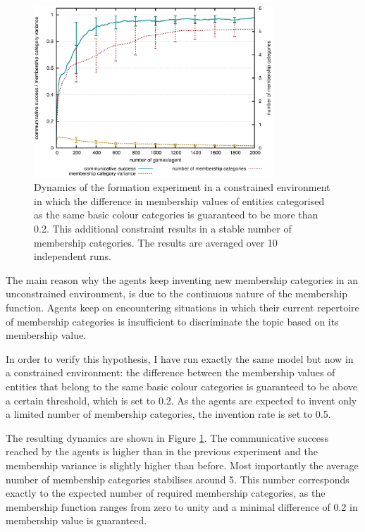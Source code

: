 \begin{figure}[htpb]
  \begin{center}
    \includegraphics[width=0.8\textwidth]{./graded-membership/figures/strict-formation-constrained.pdf} %
    \caption[Dynamics of the formation experiment in a constrained
    environment]{Dynamics of the formation experiment in a
      constrained environment in which the difference in membership
      values of entities categorised as the same basic colour
      categories is guaranteed to be more than 0.2. This additional
      constraint results in a stable number of membership
      categories. The results are averaged over 10 independent runs.}
    \label{f:gm-formation-constrained-dynamics}
  \end{center}
\end{figure}

The main reason why the agents keep inventing new membership
categories in an unconstrained environment, is due to the continuous
nature of the membership function. Agents keep on encountering
situations in which their current repertoire of membership categories
is insufficient to discriminate the topic based on its membership
value. 

In order to verify this hypothesis, I have run exactly the same
model but now in a constrained environment: the difference between the
membership values of entities that belong to the same basic colour
categories is guaranteed to be above a certain threshold, which is set
to 0.2. As the agents are expected to invent only a limited number of
membership categories, the invention rate is set to 0.5.

The resulting dynamics are shown in Figure
\ref{f:gm-formation-constrained-dynamics}. The communicative success
reached by the agents is higher than in the previous experiment and
the membership variance is slightly higher than before. Most
importantly the average number of membership categories stabilises
around 5. This number corresponds exactly to the expected number of
required membership categories, as the membership function ranges from
zero to unity and a minimal difference of 0.2 in membership value is
guaranteed.



